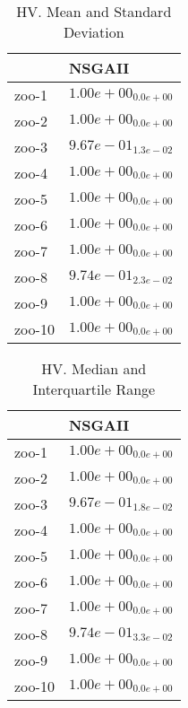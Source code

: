 \documentclass{article}
\begin{document}
\begin{table}
\caption{HV. Mean and Standard Deviation}
\label{table: HV}
\centering
\begin{scriptsize}
\begin{tabular}{ll}
\hline &  NSGAII\\
\hline 
zoo-1 & \cellcolor{gray95}$  1.00e+00_{ 0.0e+00}$ \\
zoo-2 & \cellcolor{gray95}$  1.00e+00_{ 0.0e+00}$ \\
zoo-3 & \cellcolor{gray95}$  9.67e-01_{ 1.3e-02}$ \\
zoo-4 & \cellcolor{gray95}$  1.00e+00_{ 0.0e+00}$ \\
zoo-5 & \cellcolor{gray95}$  1.00e+00_{ 0.0e+00}$ \\
zoo-6 & \cellcolor{gray95}$  1.00e+00_{ 0.0e+00}$ \\
zoo-7 & \cellcolor{gray95}$  1.00e+00_{ 0.0e+00}$ \\
zoo-8 & \cellcolor{gray95}$  9.74e-01_{ 2.3e-02}$ \\
zoo-9 & \cellcolor{gray95}$  1.00e+00_{ 0.0e+00}$ \\
zoo-10 & \cellcolor{gray95}$  1.00e+00_{ 0.0e+00}$ \\
\hline
\end{tabular}
\end{scriptsize}
\end{table}

\begin{table}
\caption{HV. Median and Interquartile Range}
\label{table: HV}
\centering
\begin{scriptsize}
\begin{tabular}{ll}
\hline &  NSGAII\\
\hline 
zoo-1 & \cellcolor{gray95}$  1.00e+00_{ 0.0e+00}$ \\
zoo-2 & \cellcolor{gray95}$  1.00e+00_{ 0.0e+00}$ \\
zoo-3 & \cellcolor{gray95}$  9.67e-01_{ 1.8e-02}$ \\
zoo-4 & \cellcolor{gray95}$  1.00e+00_{ 0.0e+00}$ \\
zoo-5 & \cellcolor{gray95}$  1.00e+00_{ 0.0e+00}$ \\
zoo-6 & \cellcolor{gray95}$  1.00e+00_{ 0.0e+00}$ \\
zoo-7 & \cellcolor{gray95}$  1.00e+00_{ 0.0e+00}$ \\
zoo-8 & \cellcolor{gray95}$  9.74e-01_{ 3.3e-02}$ \\
zoo-9 & \cellcolor{gray95}$  1.00e+00_{ 0.0e+00}$ \\
zoo-10 & \cellcolor{gray95}$  1.00e+00_{ 0.0e+00}$ \\
\hline
\end{tabular}
\end{scriptsize}
\end{table}
\end{document}
